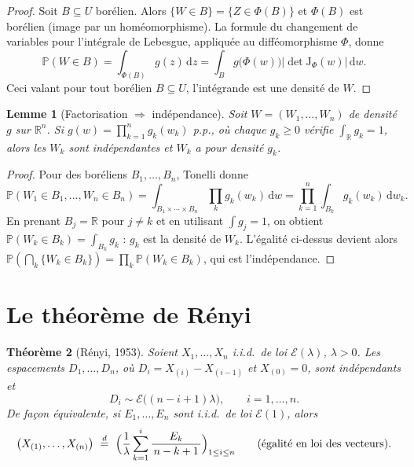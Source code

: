\documentclass[11pt,a4paper]{article}
\theoremstyle{plain}
\newtheorem{theoreme}{Théorème}[section]
\newtheorem{lemme}[theoreme]{Lemme}
\theoremstyle{definition}
\theoremstyle{remark}
\newcommand{\R}{\mathbb{R}}
\newcommand{\Prob}{\mathbb{P}}
\newcommand{\Expo}{\mathcal{E}}
\newcommand{\eqd}{\overset{d}{=}}
\newcommand{\Xord}[1]{X_{(#1)}}
\newcommand{\dd}{\,\mathrm{d}}
\newcommand{\Jac}{\mathrm{J}}
\begin{document}
\begin{proof}
Soit $B\subseteq U$ borélien. Alors $\{W\in B\}=\{Z\in\Phi(B)\}$ et $\Phi(B)$ est
borélien (image par un homéomorphisme). La formule du changement de variables
pour l'intégrale de Lebesgue, appliquée au difféomorphisme $\Phi$, donne
\[
\Prob(W\in B)=\int_{\Phi(B)}g(z)\dd z=\int_{B}g\bigl(\Phi(w)\bigr)\bigl|\det \Jac_\Phi(w)\bigr|\dd w .
\]
Ceci valant pour tout borélien $B\subseteq U$, l'intégrande est une densité de $W$.
\end{proof}

\begin{lemme}[Factorisation $\Rightarrow$ indépendance]\label{lem:factorisation}
Soit $W=(W_1,\dots,W_n)$ de densité $g$ sur $\R^n$. Si
$g(w)=\prod_{k=1}^n g_k(w_k)$ p.p., où chaque $g_k\ge0$ vérifie
$\int_\R g_k=1$, alors les $W_k$ sont indépendantes et $W_k$ a pour densité $g_k$.
\end{lemme}

\begin{proof}
Pour des boréliens $B_1,\dots,B_n$, Tonelli donne
\[
\Prob(W_1\in B_1,\dots,W_n\in B_n)=\int_{B_1\times\cdots\times B_n}\prod_k g_k(w_k)\dd w
=\prod_{k=1}^n\int_{B_k}g_k(w_k)\dd w_k .
\]
En prenant $B_j=\R$ pour $j\ne k$ et en utilisant $\int g_j=1$, on obtient
$\Prob(W_k\in B_k)=\int_{B_k}g_k$ : $g_k$ est la densité de $W_k$. L'égalité
ci-dessus devient alors
$\Prob(\bigcap_k\{W_k\in B_k\})=\prod_k\Prob(W_k\in B_k)$, qui est l'indépendance.
\end{proof}

\section{Le théorème de Rényi}

\begin{theoreme}[Rényi, 1953]\label{th:renyi}
Soient $X_1,\dots,X_n$ i.i.d.\ de loi $\Expo(\lambda)$, $\lambda>0$. Les
espacements $D_1,\dots,D_n$, où $D_i=\Xord i-\Xord{i-1}$ et $\Xord0=0$, sont
\emph{indépendants} et
\[
D_i\sim\Expo\bigl((n-i+1)\lambda\bigr),\qquad i=1,\dots,n .
\]
De façon équivalente, si $E_1,\dots,E_n$ sont i.i.d.\ de loi $\Expo(1)$, alors
\[
\bigl(\Xord1,\dots,\Xord n\bigr)\ \eqd\
\Bigl(\frac1\lambda\sum_{k=1}^{i}\frac{E_k}{\,n-k+1\,}\Bigr)_{1\le i\le n}
\qquad\text{(égalité en loi des vecteurs).}
\]
\end{theoreme}
\end{document}
